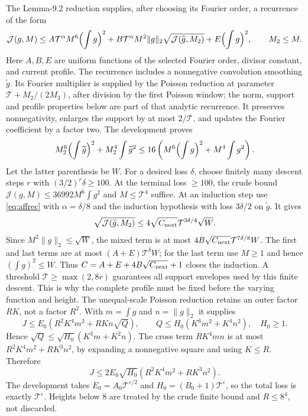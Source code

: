 \documentclass[11pt,a4paper,oneside]{article}
\theoremstyle{definition}
\newcommand{\eps}{\varepsilon}
\numberwithin{equation}{section}
\begin{document}
The Lemma-9.2 reduction supplies, after choosing its Fourier order,
a recurrence of the form
\begin{equation}\label{eq:affrec}
 \mathcal J(g,M)\le A\mathcal T^\alpha M^6\Bigl(\int g\Bigr)^2
 +B\mathcal T^\alpha M^2\|g\|_2
       \sqrt{\mathcal J(\widetilde g,M_2)}
 +E\Bigl(\int g\Bigr)^2,
 \qquad M_2\le M.
\end{equation}
Here $A,B,E$ are uniform functions of the selected Fourier order, divisor
constant, and current profile. The recurrence includes a nonnegative convolution smoothing $\widetilde g$. Its Fourier multiplier is supplied by the Poisson reduction at parameter $\mathcal T+M_2/(2M_3)$, after division by the first Poisson window; the norm, support and profile properties below are part of that analytic recurrence.
It preserves nonnegativity, enlarges the support by at most $2/\mathcal T$,
and updates the Fourier coefficient by a factor two. The development proves
\[
 M_2^6\Bigl(\int\widetilde g\Bigr)^2+M_2^4\int\widetilde g^2
 \le16\left(M^6\Bigl(\int g\Bigr)^2+M^4\int g^2\right).
\]
Let the latter parenthesis be $W$. For a desired loss $\delta$, choose finitely
many descent steps $r$ with $(3/2)^r\delta\ge100$. At the terminal loss
$\ge100$, the crude bound
$\mathcal J(g,M)\le36992M^6\int g^2$ and $M\le\mathcal T^4$ suffice.
At an induction step use \eqref{eq:affrec} with $\alpha=\delta/8$ and the
induction hypothesis with loss $3\delta/2$ on $\widetilde g$. It gives
\[
 \sqrt{\mathcal J(\widetilde g,M_2)}
 \le4\sqrt{C_{\rm next}}\mathcal T^{3\delta/4}\sqrt W.
\]
Since $M^2\|g\|_2\le\sqrt W$, the mixed term is at most
$4B\sqrt{C_{\rm next}}\mathcal T^{7\delta/8}W$.
The first and last terms are at most $(A+E)\mathcal T^\delta W$; for the last term use $M\ge1$ and hence $(\int g)^2\le W$.
Thus $C=A+E+4B\sqrt{C_{\rm next}}+1$ closes the induction. A threshold
$\mathcal T\ge\max(2,8r)$ guarantees all support envelopes used by this
finite descent. This is why the complete profile must be fixed before the
varying function and height.
The unequal-scale Poisson reduction retains an outer factor $RK$, not a
factor $R^2$. With $m=\int g$ and $n=\|g\|_2$ it supplies
\[
 J\le E_0(R^2K^4m^2+RK n\sqrt Q),\qquad
 Q\le H_0(K^6m^2+K^4n^2),\quad H_0\ge1.
\]
Hence $\sqrt Q\le\sqrt{H_0}(K^3m+K^2n)$. The cross term
$RK^4mn$ is at most $R^2K^4m^2+RK^3n^2$, by expanding a nonnegative
square and using $K\le R$. Therefore
\[
 J\le2E_0\sqrt{H_0}(R^2K^4m^2+RK^3n^2).
\]
The development takes $E_0=A_0\mathcal T^{\eps/2}$ and
$H_0=(B_0+1)\mathcal T^\eps$, so the total loss is exactly
$\mathcal T^\eps$. Heights below $8$ are treated by the crude finite
bound and $R\le8^4$, not discarded.
\end{document}
